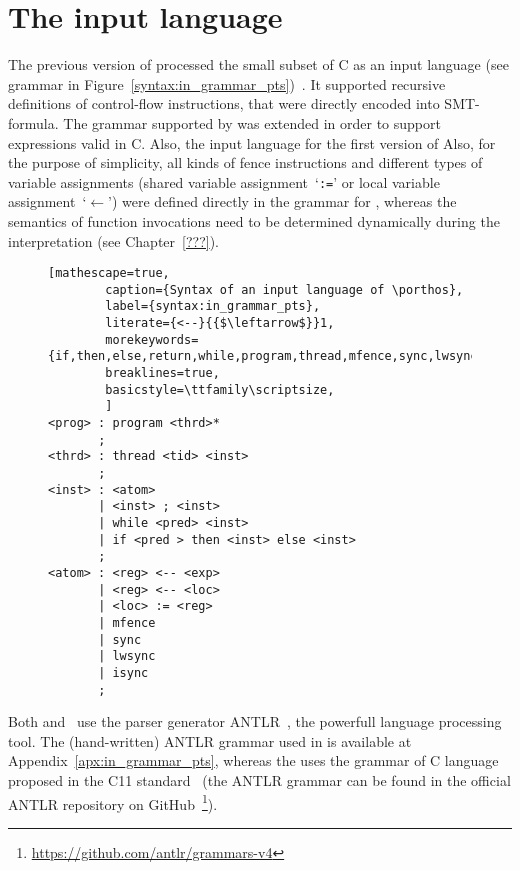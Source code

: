 \chapter{The input language}
\label{ch:impl}


The previous version of \porthos processed the small subset of C as an input language (see grammar in Figure~\ref{syntax:in_grammar_pts})~\cite{Porthos17}.
It supported recursive definitions of control-flow instructions, that were directly encoded into SMT-formula.
The grammar supported by \porthos[2] was extended in order to support expressions valid in C. %
Also, the input language for the first version of \porthos  
Also, for the purpose of simplicity, all kinds of fence instructions and different types of variable assignments (shared variable assignment~`\texttt{:=}' or local variable assignment~`$\mathtt{\leftarrow}$') were defined directly in the grammar for \porthos, whereas the semantics of function invocations need to be determined dynamically during the interpretation
(see Chapter~\ref{???}).


\begin{figure}%
\begin{lstlisting}[mathescape=true,
        caption={Syntax of an input language of \porthos},
        label={syntax:in_grammar_pts},
        literate={<--}{{$\leftarrow$}}1,
        morekeywords={if,then,else,return,while,program,thread,mfence,sync,lwsync,isync}
        breaklines=true,
        basicstyle=\ttfamily\scriptsize,
        ]
<prog> : program <thrd>*
       ;
<thrd> : thread <tid> <inst>
       ;
<inst> : <atom> 
       | <inst> ; <inst>
       | while <pred> <inst>
       | if <pred > then <inst> else <inst>
       ;
<atom> : <reg> <-- <exp> 
       | <reg> <-- <loc>
       | <loc> := <reg> 
       | mfence
       | sync
       | lwsync
       | isync
       ;
\end{lstlisting}
\end{figure}


Both \porthos and \porthos[2] \ use the parser generator ANTLR~\cite{parr2013definitive}, the powerfull language processing tool. The (hand-written) ANTLR grammar used in \porthos is available at Appendix~\ref{apx:in_grammar_pts}, whereas the \porthos[2] uses the grammar of C language proposed in the C11 standard~\cite{jtc2011sc22} (the ANTLR grammar can be found in the official ANTLR repository on GitHub~\footnote{\url{https://github.com/antlr/grammars-v4}}).
